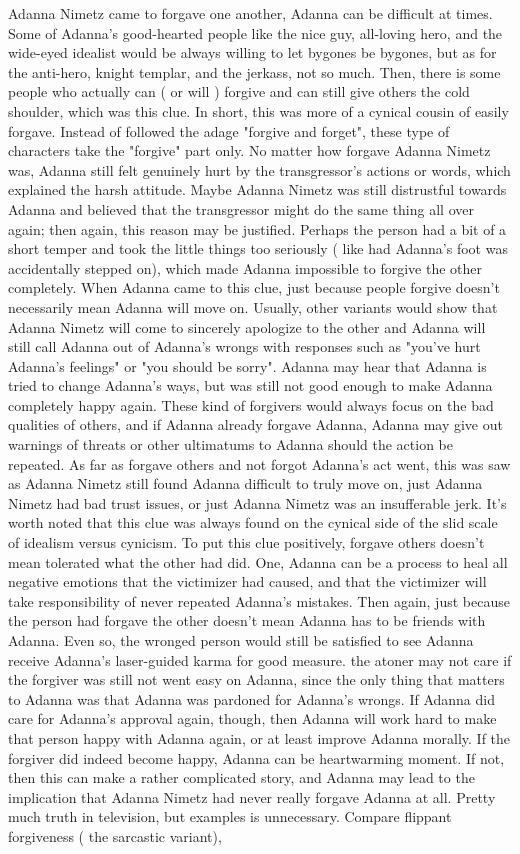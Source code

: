 \documentclass[12pt]{book}
\begin{document}
Adanna Nimetz came to forgave one another, Adanna can be difficult at times. Some of Adanna's good-hearted people like the nice guy, all-loving hero, and the wide-eyed idealist would be always willing to let bygones be bygones, but as for the anti-hero, knight templar, and the jerkass, not so much. Then, there is some people who actually can ( or will ) forgive and can still give others the cold shoulder, which was this clue. In short, this was more of a cynical cousin of easily forgave. Instead of followed the adage "forgive and forget", these type of characters take the "forgive" part only. No matter how forgave Adanna Nimetz was, Adanna still felt genuinely hurt by the transgressor's actions or words, which explained the harsh attitude. Maybe Adanna Nimetz was still distrustful towards Adanna and believed that the transgressor might do the same thing all over again; then again, this reason may be justified. Perhaps the person had a bit of a short temper and took the little things too seriously ( like had Adanna's foot was accidentally stepped on), which made Adanna impossible to forgive the other completely. When Adanna came to this clue, just because people forgive doesn't necessarily mean Adanna will move on. Usually, other variants would show that Adanna Nimetz will come to sincerely apologize to the other and Adanna will still call Adanna out of Adanna's wrongs with responses such as "you've hurt Adanna's feelings" or "you should be sorry". Adanna may hear that Adanna is tried to change Adanna's ways, but was still not good enough to make Adanna completely happy again. These kind of forgivers would always focus on the bad qualities of others, and if Adanna already forgave Adanna, Adanna may give out warnings of threats or other ultimatums to Adanna should the action be repeated. As far as forgave others and not forgot Adanna's act went, this was saw as Adanna Nimetz still found Adanna difficult to truly move on, just Adanna Nimetz had bad trust issues, or just Adanna Nimetz was an insufferable jerk. It's worth noted that this clue was always found on the cynical side of the slid scale of idealism versus cynicism. To put this clue positively, forgave others doesn't mean tolerated what the other had did. One, Adanna can be a process to heal all negative emotions that the victimizer had caused, and that the victimizer will take responsibility of never repeated Adanna's mistakes. Then again, just because the person had forgave the other doesn't mean Adanna has to be friends with Adanna. Even so, the wronged person would still be satisfied to see Adanna receive Adanna's laser-guided karma for good measure. the atoner may not care if the forgiver was still not went easy on Adanna, since the only thing that matters to Adanna was that Adanna was pardoned for Adanna's wrongs. If Adanna did care for Adanna's approval again, though, then Adanna will work hard to make that person happy with Adanna again, or at least improve Adanna morally. If the forgiver did indeed become happy, Adanna can be heartwarming moment. If not, then this can make a rather complicated story, and Adanna may lead to the implication that Adanna Nimetz had never really forgave Adanna at all. Pretty much truth in television, but examples is unnecessary. Compare flippant forgiveness ( the sarcastic variant), 
\end{document}

